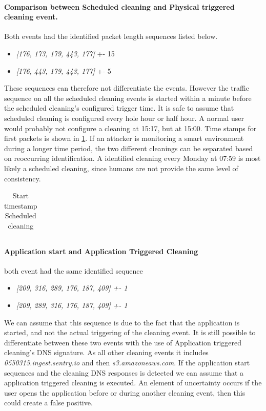 \paragraph{Comparison between Scheduled cleaning and Physical triggered cleaning event.} Both events had the identified packet length sequences listed below. 
\begin{itemize}
    \item \textit{[176, 173, 179, 443, 177]} +- 15
    \item \textit{[176, 443, 179, 443, 177]} +- 5
\end{itemize}
These sequences can therefore not differentiate the events. However the traffic sequence on all the scheduled cleaning events is started within a minute before the scheduled cleaning's configured trigger time. It is safe to assume that scheduled cleaning is configured every hole hour or half hour. A normal user would probably not configure a cleaning at 15:17, but at 15:00. Time stamps for first packets is shown in \ref{tab:timestampSCPC}. If an attacker is monitoring a smart environment during a longer time period, the two different cleanings can be separated based on reoccurring identification. A identified cleaning every Monday at 07:59 is most likely a scheduled cleaning, since humans are not provide the same level of consistency.



\begin{table}[H]
\centering
\caption{Start timestamp Scheduled cleaning}
\label{tab:timestampSCPC}
\begin{tabular}{|l|l|l|l|l|l|l|l|l|}
\hline

\end{tabular}
\end{table}


\paragraph{Application start and Application Triggered Cleaning}
both event had the same identified sequence
\begin{itemize}
    \item \textit{[209, 316, 289, 176, 187, 409] +- 1}
    \item \textit{[209, 289, 316, 176, 187, 409] +- 1}
\end{itemize}
We can assume that this sequence is due to the fact that the application is started, and not the actual triggering of the cleaning event. It is still possible to differentiate between these two events with the use of Application triggered cleaning's DNS signature. As all other cleaning events it includes \textit{0550315.ingest.sentry.io} and then \textit{s3.amazoneaws.com}. If the application start sequences and the cleaning DNS responses is detected we can assume that a application triggered cleaning is executed. An element of uncertainty occurs if the user opens the application before or during another cleaning event, then this could create a false positive. 

